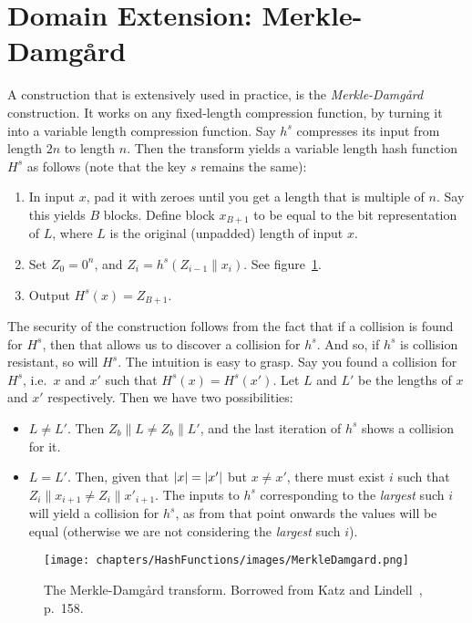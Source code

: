 \section{Domain Extension: Merkle-Damgård}
  \label{sec:merkle_damgard}
  A construction that is extensively used in practice, is the \emph{Merkle-Damgård} construction. It works on any fixed-length compression function, by turning it into a variable length compression function. Say $h^s$ compresses its input from length $2n$ to length $n$. Then the transform yields a variable length hash function $H^s$ as follows (note that the key $s$ remains the same):
  \begin{enumerate}
    \item In input $x$, pad it with zeroes until you get a length that is multiple of $n$. Say this yields $B$ blocks. Define block $x_{B+1}$ to be equal to the bit representation of $L$, where $L$ is the original (unpadded) length of input $x$.
    \item Set $Z_0 = 0^n$, and $Z_i = h^s(Z_{i-1}\|x_i)$. See figure~\ref{fig:merkle_damgard}.
    \item Output $H^s(x) = Z_{B+1}$.
  \end{enumerate}
  The security of the construction follows from the fact that if a collision is found for $H^s$, then that allows us to discover a collision for $h^s$. And so, if $h^s$ is collision resistant, so will $H^s$. The intuition is easy to grasp. Say you found a collision for $H^s$, i.e.\ $x$ and $x'$ such that $H^s(x) = H^s(x')$. Let $L$ and $L'$ be the lengths of $x$ and $x'$ respectively. Then we have two possibilities:
  \begin{itemize}
    \item $L\neq L'$. Then $Z_b\|L \neq Z_b\|L'$, and the last iteration of $h^s$ shows a collision for it.
    \item $L=L'$. Then, given that $\lvert x\rvert = \lvert x'\rvert$ but $x\neq x'$, there must exist $i$ such that $Z_i\|x_{i+1} \neq Z_i\|x'_{i+1}$. The inputs to $h^s$ corresponding to the \emph{largest} such $i$ will yield a collision for $h^s$, as from that point onwards the values will be equal (otherwise we are not considering the \emph{largest} such $i$).
  \end{itemize}

  \begin{figure}
    \centering
    \texttt{[image: chapters/HashFunctions/images/MerkleDamgard.png]}
    \caption{The Merkle-Damgård transform. Borrowed from Katz and Lindell~\cite{KatzLindell:IMC}, p.\ 158.}
    \label{fig:merkle_damgard}
  \end{figure}

